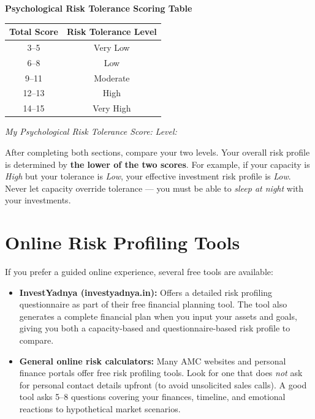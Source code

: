 \documentclass[12pt,a4paper]{article}
\begin{document}
\vspace{2mm}

\begin{tcolorbox}[base, colback=ToleranceColor!7, colframe=ToleranceColor]
\centering
\textbf{\color{ToleranceColor}Psychological Risk Tolerance Scoring Table}

\medskip
\begin{tabular}{cc}
\toprule
\textbf{Total Score} & \textbf{Risk Tolerance Level}\\
\midrule
3--5 & Very Low\\
6--8 & Low\\
9--11 & Moderate\\
12--13 & High\\
14--15 & Very High\\
\bottomrule
\end{tabular}

\medskip
\textit{My Psychological Risk Tolerance Score: }\underline{\hspace{2cm}}
\quad
\textit{Level: }\underline{\hspace{3cm}}
\end{tcolorbox}

\vspace{2mm}

\begin{keybox}
After completing both sections, compare your two levels. Your overall risk profile is determined by \textbf{the lower of the two scores}. For example, if your capacity is \textit{High} but your tolerance is \textit{Low}, your effective investment risk profile is \textit{Low}. Never let capacity override tolerance --- you must be able to \textit{sleep at night} with your investments.
\end{keybox}

\section{Online Risk Profiling Tools}

If you prefer a guided online experience, several free tools are available:

\begin{itemize}
  \item \textbf{InvestYadnya (investyadnya.in):} Offers a detailed risk profiling questionnaire as part of their free financial planning tool. The tool also generates a complete financial plan when you input your assets and goals, giving you both a capacity-based and questionnaire-based risk profile to compare.

  \item \textbf{General online risk calculators:} Many AMC websites and personal finance portals offer free risk profiling tools. Look for one that does \textit{not} ask for personal contact details upfront (to avoid unsolicited sales calls). A good tool asks 5--8 questions covering your finances, timeline, and emotional reactions to hypothetical market scenarios.
\end{itemize}
\end{document}
